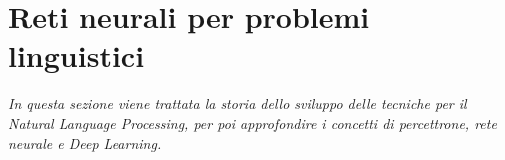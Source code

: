 \section{Reti neurali per problemi linguistici}
\textit{In questa sezione viene trattata la storia dello sviluppo delle tecniche per il Natural Language Processing, per poi approfondire i concetti di percettrone, rete neurale e Deep Learning.}





